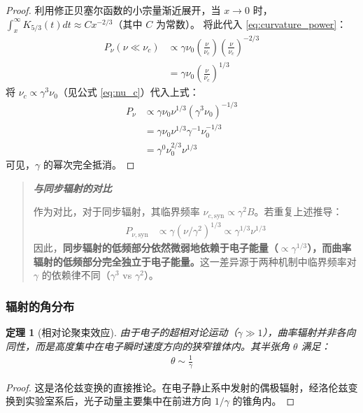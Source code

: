 \documentclass[12pt,oneside]{ctexart}
\theoremstyle{definition}
\theoremstyle{plain}
\newtheorem{theorem}[definition]{定理}
\theoremstyle{remark}
\newif\ifshowderiv
\newcommand{\derivdefaulttitle}{额外说明}
\newenvironment{derivationnote}[1][\derivdefaulttitle]{%
  \ifshowderiv\begin{quote}\small\itshape
  \noindent\textbf{#1}\;\par
}{%
  \end{quote}\fi
}
\begin{document}
\begin{proof}
利用修正贝塞尔函数的小宗量渐近展开，当 $x \to 0$ 时，$\int_x^{\infty} K_{5/3}(t) dt \approx C x^{-2/3}$（其中 $C$ 为常数）。
将此代入 \eqref{eq:curvature_power}：
\begin{align}
P_{\nu} (\nu \ll \nu_c) &\propto \gamma \nu_0 \left( \frac{\nu}{\nu_c} \right) \left( \frac{\nu}{\nu_c} \right)^{-2/3} \nonumber \\
&= \gamma \nu_0 \left( \frac{\nu}{\nu_c} \right)^{1/3} \label{eq:low_freq_step1}
\end{align}
将 $\nu_c \propto \gamma^3 \nu_0$（见公式 \eqref{eq:nu_c}）代入上式：
\begin{align}
P_{\nu} &\propto \gamma \nu_0 \nu^{1/3} (\gamma^3 \nu_0)^{-1/3} \nonumber \\
&= \gamma \nu_0 \nu^{1/3} \gamma^{-1} \nu_0^{-1/3} \nonumber \\
&= \gamma^{0} \nu_0^{2/3} \nu^{1/3} \label{eq:gamma_independence}
\end{align}
可见，$\gamma$ 的幂次完全抵消。
\end{proof}

\begin{derivationnote}[与同步辐射的对比]
作为对比，对于同步辐射，其临界频率 $\nu_{c, \mathrm{syn}} \propto \gamma^2 B$。若重复上述推导：
\begin{align}
P_{\nu, \mathrm{syn}} &\propto \gamma (\nu / \gamma^2)^{1/3} \propto \gamma^{1/3} \nu^{1/3}
\end{align}
因此，\textbf{同步辐射的低频部分依然微弱地依赖于电子能量（$\propto \gamma^{1/3}$），而曲率辐射的低频部分完全独立于电子能量。}这一差异源于两种机制中临界频率对 $\gamma$ 的依赖律不同（$\gamma^3$ vs $\gamma^2$）。
\end{derivationnote}

\subsubsection{辐射的角分布}

\begin{theorem}[相对论聚束效应]
由于电子的超相对论运动（$\gamma \gg 1$），曲率辐射并非各向同性，而是高度集中在电子瞬时速度方向的狭窄锥体内。其半张角 $\theta$ 满足：
\begin{align}
\theta \sim \frac{1}{\gamma} \label{eq:beaming}
\end{align}
\end{theorem}

\begin{proof}
这是洛伦兹变换的直接推论。在电子静止系中发射的偶极辐射，经洛伦兹变换到实验室系后，光子动量主要集中在前进方向 $1/\gamma$ 的锥角内。
\end{proof}
\end{document}
